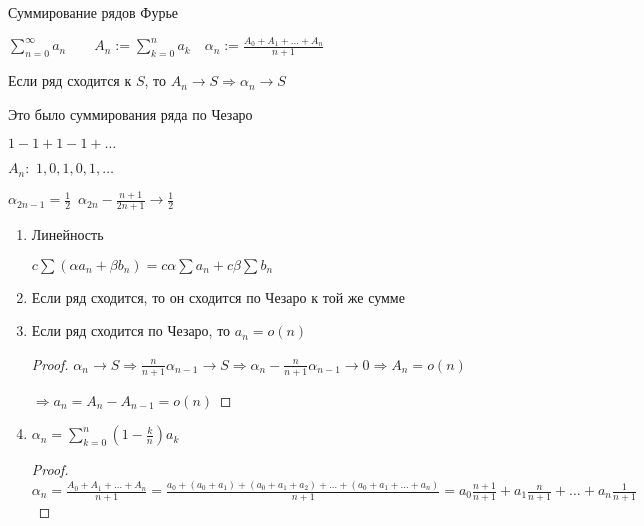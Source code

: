 
Суммирование рядов Фурье

\begin{definition}\thmslashn

	$\sum\limits_{n = 0}^{\infty} a_n \qquad A_n := \sum\limits_{k = 0}^{n} a_k \quad \alpha_n := \frac{A_0 + A_1 + \ldots + A_n}{n+1}$
	
	Если ряд сходится к $S$, то $A_n \to S \Rightarrow \alpha_n\to S$

	Это было суммирования ряда по Чезаро
	
\end{definition}

\begin{example}\thmslashn
	
	$1- 1 + 1 - 1+ \ldots$
	
	$A_n: \,\,1 , 0, 1, 0, 1, \ldots$
	
	$\alpha_{2n - 1} = \frac{1}{2}\,\,\,\alpha_{2n} - \frac{n + 1}{2n+1} \to \frac{1}{2}$
	
\end{example}

\begin{consequence}\thmslashn

	\begin{enumerate}
		\item 
		Линейность 
		
		$c\sum (\alpha a_n + \beta b_n) = c\alpha\sum a_n + c\beta \sum b_n$
		
		\item 
		Если ряд сходится, то он сходится по Чезаро к той же сумме
		
		\item
		Если ряд сходится по Чезаро, то $a_n = o(n)$
		
		\begin{proof}\thmslashn
			
			$\alpha_n \to S \Rightarrow \frac{n}{n+1} \alpha_{n-1} \to S \Rightarrow \alpha_n - \frac{n}{n+1} \alpha_{n-1} \to 0 \Rightarrow A_n = o(n)$
			
			$\Rightarrow a_n = A_n - A_{n-1} = o(n)$
			
		\end{proof}
	
		\item
		$\alpha_n = \sum\limits_{k = 0}^n \left( 1 - \frac{k}{n} \right)a_k$
		
		\begin{proof}\thmslashn
			
		$\alpha_n = \frac{A_0 + A_1 + \ldots + A_n}{n+1} = \frac{a_0 + (a_0 + a_1) + (a_0 + a_1 + a_2) + \ldots + (a_0 + a_1 + \ldots + a_n)}{n+1} = a_0 \frac{n+1}{n+1} + a_1\frac{n}{n+1} + \ldots + a_n\frac{1}{n+1}$
			
		\end{proof}
	
	\end{enumerate}

\end{consequence}

